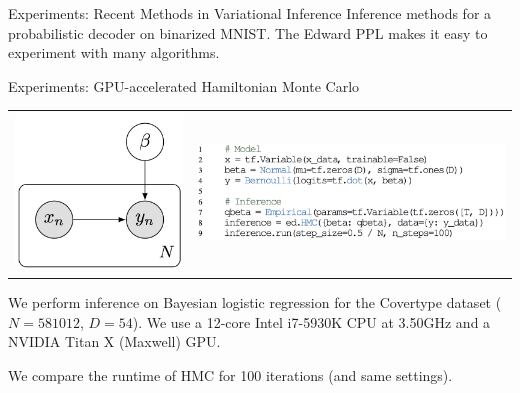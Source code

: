 \documentclass[final]{beamer}
\begin{document}
\begin{frame}[t]
\begin{columns}[t]
\begin{column}{\onecolwid}
\begin{block}{Experiments: Recent Methods in Variational Inference}
Inference methods for a probabilistic decoder on binarized
MNIST. The Edward \acrshort{PPL} makes it easy to experiment with many algorithms.
\end{block}

\begin{block}{Experiments: GPU-accelerated Hamiltonian Monte Carlo}
\begin{tabular}{cc}
\hspace{-1em}
\includegraphics{img/logistic_graph.png}
&
\includegraphics{img/logistic_code.png}
\end{tabular}
\vspace{1ex}

We perform inference on Bayesian logistic regression for the
Covertype dataset ($N=581012$, $D=54$). We use a 12-core Intel i7-5930K
CPU at 3.50GHz and a NVIDIA Titan X (Maxwell) GPU.

We compare the runtime of HMC for 100 iterations (and same settings).
\vspace{1ex}


\end{block}
\end{column}
\end{columns}
\end{frame}
\end{document}
